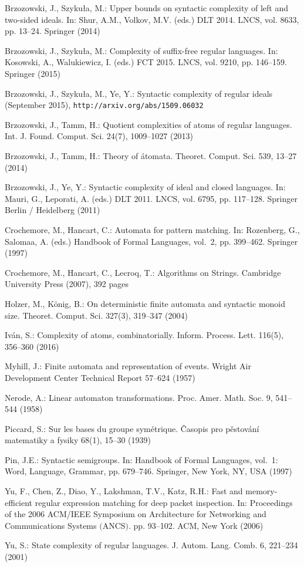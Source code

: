\documentclass[final]{dmtcs-episciences}
\theoremstyle{definition}
\theoremstyle{remark}
\begin{document}
\begin{thebibliography}{10}
Brzozowski, J., Szyku{\l}a, M.: Upper bounds on syntactic complexity of left
  and two-sided ideals. In: Shur, A.M., Volkov, M.V. (eds.) DLT 2014. LNCS,
  vol. 8633, pp. 13--24. Springer (2014)

Brzozowski, J., Szyku{\l}a, M.: Complexity of suffix-free regular languages.
  In: Kosowski, A., Walukiewicz, I. (eds.) FCT 2015. LNCS, vol. 9210, pp.
  146--159. Springer (2015)

Brzozowski, J., Szyku{\l}a, M., Ye, Y.: Syntactic complexity of regular ideals
  (September 2015), {\small\tt http://arxiv.org/abs/1509.06032}

Brzozowski, J., Tamm, H.: Quotient complexities of atoms of regular languages.
  Int. J. Found. Comput. Sci.  24(7),  1009--1027 (2013)

Brzozowski, J., Tamm, H.: Theory of \'atomata. Theoret. Comput. Sci.  539,
  13--27 (2014)

Brzozowski, J., Ye, Y.: Syntactic complexity of ideal and closed languages. In:
  Mauri, G., Leporati, A. (eds.) DLT 2011. LNCS, vol. 6795, pp. 117--128.
  Springer Berlin / Heidelberg (2011)

Crochemore, M., Hancart, C.: Automata for pattern matching. In: Rozenberg, G.,
  Salomaa, A. (eds.) Handbook of Formal Languages, vol.~2, pp. 399--462.
  Springer (1997)

Crochemore, M., Hancart, C., Lecroq, T.: Algorithms on Strings. Cambridge
  University Press (2007), 392 pages

Holzer, M., K\"{o}nig, B.: On deterministic finite automata and syntactic
  monoid size. Theoret. Comput. Sci.  327(3),  319--347 (2004)

Iv\'an, S.: Complexity of atoms, combinatorially. Inform. Process. Lett.
  116(5),  356--360 (2016)

Myhill, J.: Finite automata and representation of events. Wright Air
  Development Center Technical Report  57--624 (1957)

Nerode, A.: Linear automaton transformations. Proc. Amer. Math. Soc.  9,
  541--544 (1958)

Piccard, S.: Sur les bases du groupe sym\'etrique. \v{C}asopis pro
  p\v{e}stov\'an\'i matematiky a fysiky  68(1),  15--30 (1939)

Pin, J.E.: Syntactic semigroups. In: Handbook of Formal Languages, vol.~1:
  Word, Language, Grammar, pp. 679--746. Springer, New York, NY, USA (1997)

Yu, F., Chen, Z., Diao, Y., Lakshman, T.V., Katz, R.H.: Fast and
  memory-efficient regular expression matching for deep packet inspection. In:
  Proceedings of the 2006 ACM/IEEE Symposium on Architecture for Networking and
  Communications Systems $($ANCS\/$)$. pp. 93--102. ACM, New York (2006)

Yu, S.: State complexity of regular languages. J. Autom. Lang. Comb.  6,
  221--234 (2001)

\end{thebibliography}
\end{document}
